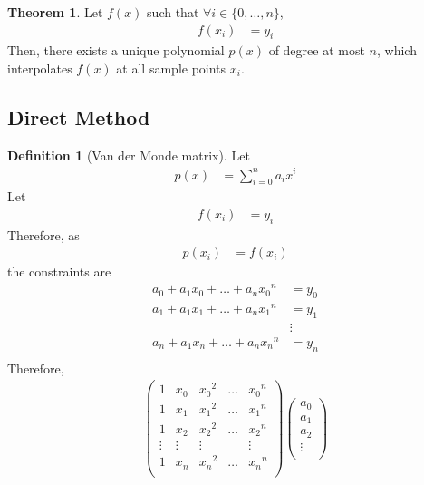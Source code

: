 \documentclass[fleqn, a4paper, 12pt, twoside, titlepage]{article}
\theoremstyle{definition}
\newtheorem{definition}{Definition}
\theoremstyle{theorem}
\newtheorem{theorem}{Theorem}
\begin{document}
\begin{theorem}
	Let $f(x)$ such that $\forall i \in \{0,\dots,n\}$,
	\begin{align*}
		f(x_i) & = y_i
	\end{align*}
	Then, there exists a unique polynomial $p(x)$ of degree at most $n$, which interpolates $f(x)$ at all sample points $x_i$.
\end{theorem}

\subsection{Direct Method}

\begin{definition}[Van der Monde matrix]
	Let
	\begin{align*}
		p(x) & = \sum\limits_{i = 0}^{n} a_i x^i
	\end{align*}
	Let
	\begin{align*}
		f(x_i) & = y_i
	\end{align*}
	Therefore, as
	\begin{align*}
		p(x_i) & = f(x_i)
	\end{align*}
	the constraints are
	\begin{align*}
		a_0 + a_1 x_0 + \dots + a_n {x_0}^n & = y_0  \\
		a_1 + a_1 x_1 + \dots + a_n {x_1}^n & = y_1  \\
                                                    & \vdots \\
		a_n + a_1 x_n + \dots + a_n {x_n}^n & = y_n  \\
	\end{align*}
	Therefore,
	\begin{align*}
			\begin{pmatrix}
				1      & x_0    & {x_0}^2 & \dots & {x_0}^n \\
				1      & x_1    & {x_1}^2 & \dots & {x_1}^n \\
				1      & x_2    & {x_2}^2 & \dots & {x_2}^n \\
				\vdots & \vdots & \vdots  &       & \vdots  \\
				1      & x_n    & {x_n}^2 & \dots & {x_n}^n \\
			\end{pmatrix}
			\begin{pmatrix}
				a_0    \\
				a_1    \\
				a_2    \\
				\vdots \\

\end{pmatrix}
\end{align*}
\end{definition}
\end{document}
